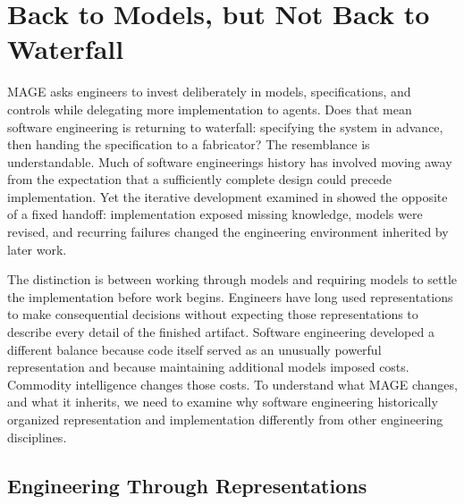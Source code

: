 


\chapter{Back to Models, but Not Back to Waterfall}

MAGE asks engineers to invest deliberately in models, specifications, and controls while delegating more implementation to agents. Does that mean software engineering is returning to waterfall: specifying the system in advance, then handing the specification to a fabricator? The resemblance is understandable. Much of software engineering\textquotesingle s history has involved moving away from the expectation that a sufficiently complete design could precede implementation. Yet the iterative development examined in  showed the opposite of a fixed handoff: implementation exposed missing knowledge, models were revised, and recurring failures changed the engineering environment inherited by later work.

The distinction is between working through models and requiring models to settle the implementation before work begins. Engineers have long used representations to make consequential decisions without expecting those representations to describe every detail of the finished artifact. Software engineering developed a different balance because code itself served as an unusually powerful representation and because maintaining additional models imposed costs. Commodity intelligence changes those costs. To understand what MAGE changes, and what it inherits, we need to examine why software engineering historically organized representation and implementation differently from other engineering disciplines.

\section{Engineering Through Representations}\label{heading:engineering-through-representations}

